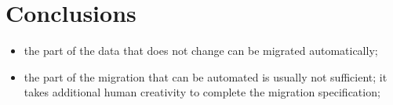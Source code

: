 \documentclass[runningheads]{llncs}
\begin{document}
%
%
%
%

\section{Conclusions}
\begin{itemize}
   \item the part of the data that does not change can be migrated automatically;
   \item the part of the migration that can be automated is usually not sufficient;
         it takes additional human creativity to complete the migration specification;
\end{itemize}


\end{document}
